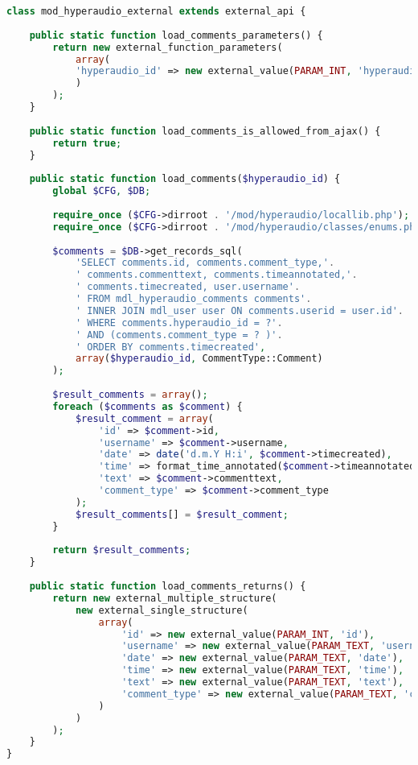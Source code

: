 \begin{lstlisting}[language=php,
             linewidth=\textwidth,
             caption={Ausschnitt der \textbf{external.php} in der 4. Iteration},
             label={lst:it4:external}]
class mod_hyperaudio_external extends external_api {
    
    public static function load_comments_parameters() {
        return new external_function_parameters(
            array(
            'hyperaudio_id' => new external_value(PARAM_INT, 'hyperaudio_id')
            )
        );
    }
    
    public static function load_comments_is_allowed_from_ajax() {
        return true;
    }
    
    public static function load_comments($hyperaudio_id) {
        global $CFG, $DB;
        
        require_once ($CFG->dirroot . '/mod/hyperaudio/locallib.php');
        require_once ($CFG->dirroot . '/mod/hyperaudio/classes/enums.php');
        
        $comments = $DB->get_records_sql(
            'SELECT comments.id, comments.comment_type,'.
            ' comments.commenttext, comments.timeannotated,'.
            ' comments.timecreated, user.username'.
            ' FROM mdl_hyperaudio_comments comments'.
            ' INNER JOIN mdl_user user ON comments.userid = user.id'.
            ' WHERE comments.hyperaudio_id = ?'.
            ' AND (comments.comment_type = ? )'.
            ' ORDER BY comments.timecreated',
            array($hyperaudio_id, CommentType::Comment)
        );
        
        $result_comments = array();
        foreach ($comments as $comment) {
            $result_comment = array(
                'id' => $comment->id,
                'username' => $comment->username,
                'date' => date('d.m.Y H:i', $comment->timecreated),
                'time' => format_time_annotated($comment->timeannotated),
                'text' => $comment->commenttext,
                'comment_type' => $comment->comment_type
            );
            $result_comments[] = $result_comment;
        }
        
        return $result_comments;
    }
    
    public static function load_comments_returns() {
        return new external_multiple_structure(
            new external_single_structure(
                array(
                    'id' => new external_value(PARAM_INT, 'id'),
                    'username' => new external_value(PARAM_TEXT, 'username'),
                    'date' => new external_value(PARAM_TEXT, 'date'),
                    'time' => new external_value(PARAM_TEXT, 'time'),
                    'text' => new external_value(PARAM_TEXT, 'text'),
                    'comment_type' => new external_value(PARAM_TEXT, 'comment_type')
                )
            )
        );
    }
}             
\end{lstlisting}

